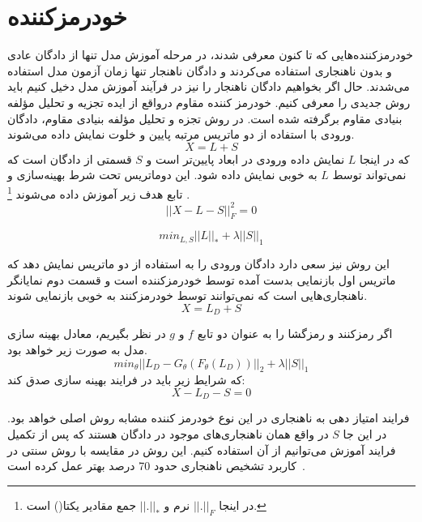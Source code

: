 \documentclass[12pt,a4paper]{report}
\theoremstyle{definition}
\theoremstyle{definition}
\begin{document}
\section{خودرمزکننده }
خودرمزکننده‌هایی که تا کنون معرفی شدند، در مرحله آموزش مدل تنها از دادگان عادی و بدون ناهنجاری استفاده می‌کردند و دادگان ناهنجار تنها زمان آزمون مدل استفاده می‌شدند. حال اگر بخواهیم دادگان ناهنجار را نیز در فرآیند آموزش مدل دخیل کنیم باید روش جدیدی را معرفی کنیم. خودرمز کننده مقاوم درواقع از ایده تجزیه و تحلیل مؤلفه بنیادی مقاوم برگرفته شده است. در روش تجزه و تحلیل مؤلفه 
بنیادی مقاوم، دادگان ورودی با استفاده از دو ماتریس مرتبه پایین و خلوت نمایش داده می‌شوند.
\begin{equation}
	X = L + S
\end{equation}
که در اینجا $L$ نمایش داده ورودی در ابعاد پایین‌تر است و $S$ قسمتی از دادگان است که نمی‌تواند توسط $L$ به خوبی نمایش داده شود. این دوماتریس تحت شرط بهینه‌سازی و تابع هدف زیر آموزش داده می‌شوند
\footnote{
در اینجا
 $||.||_F$ 
نرم  و 
$||.||_*$
 جمع مقادیر یکتا() است.
}
.
\begin{equation}
	||X-L-S||_F^2 = 0
\end{equation}

\begin{equation}
	min_{L,S} ||L||_* + \lambda||S||_1
\end{equation}

این روش نیز سعی دارد دادگان ورودی را به استفاده از دو ماتریس نمایش دهد که ماتریس اول بازنمایی بدست آمده توسط خودرمزکننده است و قسمت دوم نمایانگر ناهنجاری‌هایی است که نمی‌توانند توسط خودرمزکنند به خوبی بازنمایی شوند.
\begin{equation}
X = L_D + S
\end{equation}

اگر رمزکنند و رمزگشا را به عنوان دو تابع $f$ و $g$ در نظر بگیریم، معادل بهینه سازی مدل به صورت زیر خواهد بود.
\begin{equation}
	min_{\theta} || L_D - G_\theta(F_\theta(L_D)) ||_2 + \lambda ||S||_1
\end{equation}
که شرایط زیر باید در فرایند بهینه سازی صدق کند:
\begin{equation}
X-L_D-S=0
\end{equation}

فرایند امتیاز دهی به ناهنجاری در این نوع خودرمز کننده مشابه روش اصلی خواهد بود. در این جا $S$ در واقع همان ناهنجاری‌های موجود در دادگان هستند که پس از تکمیل فرایند آموزش می‌توانیم از آن استفاده کنیم. این روش در مقایسه با روش سنتی در کاربرد تشخیص ناهنجاری حدود 70 درصد بهتر عمل کرده است~\cite{10.1145/3097983.3098052}.
\end{document}
